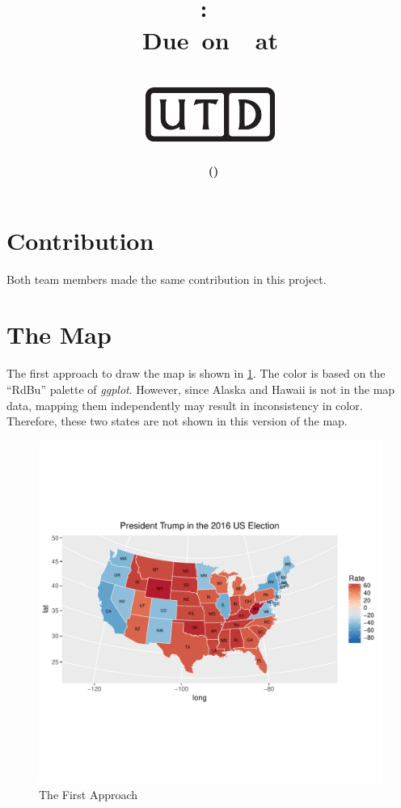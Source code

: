\documentclass[11pt,letterpaper,titlepage,en-US]{article}
\title{
    \vspace{1in}
    \textmd{\textbf{\hmwkClassName \\\hmwkClass:\ \hmwkTitle }}\\
    \normalsize\vspace{0.1in}\small{Due\ on\ \DTMusedate{DueDate}\ at \DTMusetime{DueDate} }\\
    \vspace{0.1in}\large{\textit{\hmwkClassInstructor}}\\
    \vspace{0.5in}\includegraphics[height=2.4em]{UTD_logo_BW}\\
    \vspace{2in}
}
\author{\textbf{\hmwkAuthorName\ \footnotesize{(\hmwkAuthorNetID)}} \\ }
\date{}
\begin{document}
\maketitle



{}


\section*{Contribution}
Both team members made the same contribution in this project.

\section{The Map}

The first approach to draw the map is shown in \cref{m1}.
The color is based on the ``RdBu'' palette of \emph{ggplot}.
However, since Alaska and Hawaii is not in the map data, mapping them independently
may result in inconsistency in color. Therefore, these two states are not shown in
this version of the map.
\begin{figure}[H]
\caption{The First Approach}\label{m1}
\includegraphics[width=\textwidth]{figure/app1}
\end{figure}
\end{document}
